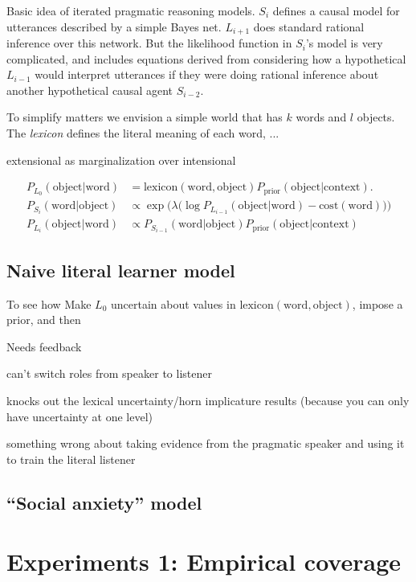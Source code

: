\documentclass{article} %
\newcommand{\word}{\text{word}}
\newcommand{\obj}{\text{object}}
\begin{document}
Basic idea of iterated pragmatic reasoning models. $S_i$ defines a causal model for utterances described by a simple Bayes net. $L_{i+1}$ does standard rational inference over this network. But the likelihood function in $S_i$'s model is very complicated, and includes equations derived from considering how a hypothetical $L_{i-1}$ would interpret utterances if they were doing rational inference about another hypothetical causal agent $S_{i-2}$.

To simplify matters we envision a simple world that has $k$ words and $l$ objects. The \textit{lexicon} defines the literal meaning of each word, ...

extensional as marginalization over intensional

\begin{align*}
P_{L_0}(\obj | \word) &= \text{lexicon}(\word, \obj) P_{\text{prior}}(\obj | \text{context}). \\
P_{S_i}(\word | \obj) &\propto \exp\Big(\lambda \big(\log P_{L_{i - 1}}(\obj | \word) - \text{cost}(\word)\big)\Big) \\
P_{L_i}(\obj | \word) &\propto P_{S_{i-1}}(\word | \obj) P_{\text{prior}}(\obj | \text{context})
\end{align*}

\subsection{Naive literal learner model}



To see how
Make $L_0$ uncertain about values in $\text{lexicon}(\word, \obj)$, impose a prior, and then

Needs feedback

can't switch roles from speaker to listener

knocks out the lexical uncertainty/horn implicature results (because you can only have uncertainty at one level)

something wrong about taking evidence from the pragmatic speaker and using it to train the literal listener

\subsection{``Social anxiety'' model}

\section{Experiments 1: Empirical coverage}
\end{document}

